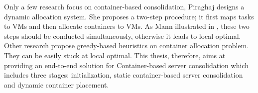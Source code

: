 Only a few research focus on container-based consolidation, Piraghaj \cite{Piraghaj:2016bw} designs a dynamic allocation system. She proposes a two-step procedure; it first maps tasks to VMs and then allocate containers to VMs. As Mann illustrated in \cite{Mann:2016hx},  these two steps should be conducted simultaneously, otherwise it leads to local optimal. Other research \cite{Dong:2014iz, Hindman:2011ux, Anselmi:2008ik} propose greedy-based heuristics on container allocation problem. They can be easily stuck at local optimal. 
This thesis, therefore, aims at providing an end-to-end solution for Container-based server consolidation which includes three stages: initialization, static container-based server consolidation and dynamic container placement.




